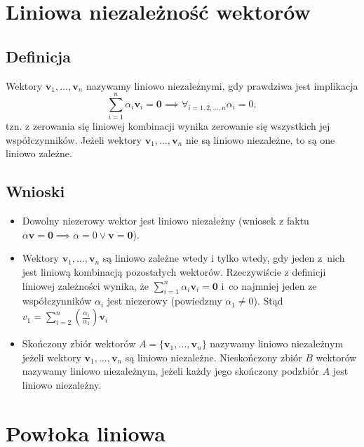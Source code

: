 \documentclass{article}
\begin{document}
\section{Liniowa niezależność wektorów}
\subsection{Definicja}
Wektory $\mathbf{v}_1, \dots, \mathbf{v}_n$ nazywamy liniowo niezależnymi, gdy prawdziwa jest implikacja
$$
    \sum_{i=1}^{n}{\alpha_{i}\mathbf{v}_{i}} = \mathbf{0} \implies \forall_{i = 1, 2, \dots, n}\alpha_{i} = 0,
$$
tzn. z zerowania się liniowej kombinacji wynika zerowanie się wszystkich jej współczynników.
Jeżeli wektory $\mathbf{v}_1, \dots, \mathbf{v}_n$ nie są liniowo niezależne, to są one liniowo zależne.
\subsection{Wnioski}
\begin{itemize}
    \item Dowolny niezerowy wektor jest liniowo niezależny (wniosek z faktu $\alpha \mathbf{v} = \mathbf{0} \implies \alpha = 0 \lor \mathbf{v} = \mathbf{0}$).
    \item Wektory $\mathbf{v}_1, \dots, \mathbf{v}_n$ są liniowo zależne wtedy i tylko wtedy, gdy jeden z~nich jest liniową kombinacją pozostałych wektorów.
    Rzeczywiście z definicji liniowej zależności wynika, że $\sum_{i=1}^{n}{\alpha_{i}\mathbf{v}_{i}} = \mathbf{0}$ i~co najmniej jeden ze współczynników $\alpha_{i}$ jest niezerowy (powiedzmy $\alpha_{1} \neq 0$).
    Stąd $v_{1} = \sum_{i=2}^{n} \left( \frac{\alpha_{i}}{\alpha_{1}}\right)\mathbf{v}_{i}$
    \item Skończony zbiór wektorów $A = \{ \mathbf{v}_1, \dots, \mathbf{v}_n \}$ nazywamy liniowo niezależnym jeżeli wektory $\mathbf{v}_1, \dots, \mathbf{v}_n$ są liniowo niezależne.
    Nieskończony zbiór $B$ wektorów nazywamy liniowo niezależnym, jeżeli każdy jego skończony podzbiór $A$ jest liniowo niezależny.
\end{itemize}

\section{Powłoka liniowa}
\end{document}
